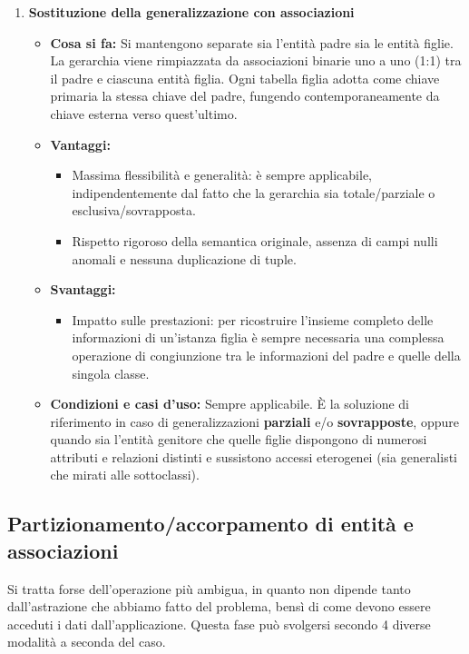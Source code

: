 \documentclass[12pt]{report}
\begin{document}
\begin{enumerate}
		\item \textbf{Sostituzione della generalizzazione con associazioni}
		\begin{itemize}
			\item \textbf{Cosa si fa:} Si mantengono separate sia l'entità padre sia le entità figlie. La gerarchia viene rimpiazzata da associazioni binarie uno a uno (1:1) tra il padre e ciascuna entità figlia. Ogni tabella figlia adotta come chiave primaria la stessa chiave del padre, fungendo contemporaneamente da chiave esterna verso quest'ultimo.
			\item \textbf{Vantaggi:}
			\begin{itemize}
				\item Massima flessibilità e generalità: è sempre applicabile, indipendentemente dal fatto che la gerarchia sia totale/parziale o esclusiva/sovrapposta.
				\item Rispetto rigoroso della semantica originale, assenza di campi nulli anomali e nessuna duplicazione di tuple.
			\end{itemize}
			\item \textbf{Svantaggi:}
			\begin{itemize}
				\item Impatto sulle prestazioni: per ricostruire l'insieme completo delle informazioni di un'istanza figlia è sempre necessaria una complessa operazione di congiunzione tra le informazioni del padre e quelle della singola classe.
			\end{itemize}
			\item \textbf{Condizioni e casi d'uso:} 
			Sempre applicabile. È la soluzione di riferimento in caso di generalizzazioni \textbf{parziali} e/o \textbf{sovrapposte}, oppure quando sia l'entità genitore che quelle figlie dispongono di numerosi attributi e relazioni distinti e sussistono accessi eterogenei (sia generalisti che mirati alle sottoclassi).
		\end{itemize}
	\end{enumerate}
	
	\subsection{Partizionamento/accorpamento di entità e associazioni}
	Si tratta forse dell'operazione più ambigua, in quanto non dipende tanto dall'astrazione che abbiamo fatto del problema, bensì di come devono essere acceduti i dati dall'applicazione.
	Questa fase può svolgersi secondo 4 diverse modalità a seconda del caso.
	
\end{document}
